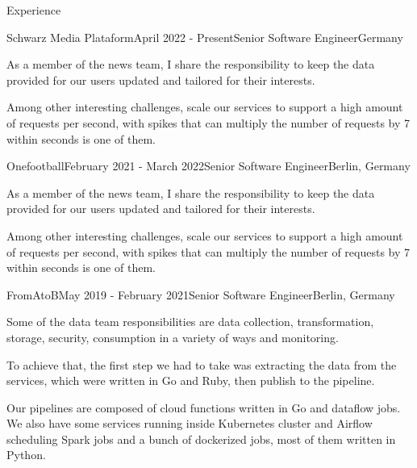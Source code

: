 \documentclass[
	a4paper, %
	11pt, %
]{resume} %
\begin{document}
\begin{rSection}{Experience}

	\begin{rSubsection}{Schwarz Media Plataform}{April 2022 - Present}{Senior Software Engineer}{Germany}
		\item As a member of the news team, I share the responsibility to keep the data provided for our users updated and tailored for their interests.

Among other interesting challenges, scale our services to support a high amount of requests per second, with spikes that can multiply the number of requests by 7 within seconds is one of them.

	\end{rSubsection}


	\begin{rSubsection}{Onefootball}{February 2021 - March 2022}{Senior Software Engineer}{Berlin, Germany}
		\item As a member of the news team, I share the responsibility to keep the data provided for our users updated and tailored for their interests.

Among other interesting challenges, scale our services to support a high amount of requests per second, with spikes that can multiply the number of requests by 7 within seconds is one of them.

	\end{rSubsection}


	\begin{rSubsection}{FromAtoB}{May 2019 - February 2021}{Senior Software Engineer}{Berlin, Germany}
		\item Some of the data team responsibilities are data collection, transformation, storage, security, consumption in a variety of ways and monitoring.

To achieve that, the first step we had to take was extracting the data from the services, which were written in Go and Ruby, then publish to the pipeline.

Our pipelines are composed of cloud functions written in Go and dataflow jobs.
We also have some services running inside Kubernetes cluster and Airflow scheduling Spark jobs and a bunch of dockerized jobs, most of them written in Python.


\end{rSubsection}
\end{rSection}
\end{document}
